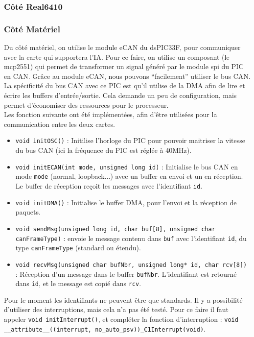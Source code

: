 \documentclass[a4,french,12pt]{article}
\begin{document}
\subsubsection{Côté Real6410}

\subsubsection{Côté Matériel}
Du côté matériel, on utilise le module eCAN du dsPIC33F, pour communiquer avec la carte qui supportera l'IA. Pour ce faire, 
on utilise un composant (le mcp2551) qui permet de transformer un signal généré par le module spi du PIC en CAN. Grâce au 
module eCAN, nous pouvons ``facilement'' utiliser le bus CAN. \\
La spécificité du bus CAN avec ce PIC est qu'il utilise de la DMA afin de lire et écrire les buffers d'entrée/sortie. Cela 
demande un peu de configuration, mais permet d'économiser des ressources pour le processeur. \\
Les fonction suivante ont été implémentées, afin d'être utilisées pour la communication entre les deux cartes.
\begin{itemize}
\item \texttt{void initOSC()} : Initilise l'horloge du PIC pour pouvoir maitriser la vitesse du bus CAN (ici la fréquence du PIC 
  est réglée à 40MHz).
\item \texttt{void initECAN(int mode, unsigned long id)} : Initialise le bus CAN en mode \texttt{mode} (normal, loopback...) 
  avec un buffer en envoi et un en réception. Le buffer de réception reçoit les messages avec l'identifiant \texttt{id}.
\item \texttt{void initDMA()} : Initialise le buffer DMA, pour l'envoi et la réception de paquets.
\item \texttt{void sendMsg(unsigned long id, char buf[8], unsigned char canFrameType)} : envoie le message contenu dans 
  \texttt{buf} avec l'identifiant \texttt{id}, du type \texttt{canFrameType} (standard ou étendu).
\item \texttt{void recvMsg(unsigned char bufNbr, unsigned long* id, char rcv[8])} : Réception d'un message dans le buffer 
  \texttt{bufNbr}. L'identifiant est retourné dans \texttt{id}, et le message est copié dans \texttt{rcv}.\\
\end{itemize} 
Pour le moment les identifiants ne peuvent être que standards. Il y a possibilité d'utiliser des interruptions, mais cela 
n'a pas été testé. Pour ce faire il faut appeler \texttt{void initInterrupt()}, et compléter la fonction d'interruption : 
\texttt{void \_\_attribute\_\_((interrupt, no\_auto\_psv))\_C1Interrupt(void)}.
\end{document}
